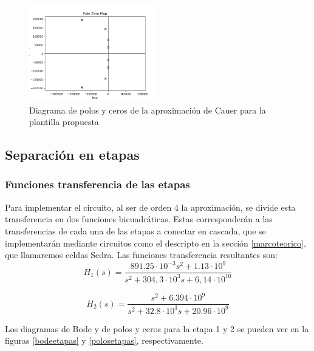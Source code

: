 \documentclass[spanish]{article}
\begin{document}
\begin{figure}[H]
\begin{centering}
\includegraphics[width=0.5\textwidth]{Resources/poloscauer.png}
\par\end{centering}
\caption{Diagrama de polos y ceros de la aproximación de Cauer para la plantilla propuesta}
\label{poloscauer}
\end{figure}

\subsection{Separación en etapas}
\subsubsection{Funciones transferencia de las etapas}
Para implementar el circuito, al ser de orden 4 la aproximación, se divide esta transferencia en dos funciones bicuadráticas. Estas corresponderán a las transferencias de cada una de las etapas a conectar en cascada, que se implementarán mediante circuitos como el descripto en la sección \ref{marcoteorico}, que llamaremos celdas Sedra.
Las funciones transferencia resultantes son:
\[
H_{1}(s)=\frac{891.25\cdot10^{-3}s^{2}+1.13\cdot10^{9}}{s^{2}+304,3\cdot10^{3}s+6,14\cdot10^{10}}
\]

\[
H_{2}(s)=\frac{s^{2}+6.394\cdot10^{9}}{s^{2}+32.8\cdot10^{3}s+20.96\cdot10^{9}}
\]

Los diagramas de Bode y de polos y ceros para la etapa 1 y 2 se pueden ver en la figuras \ref{bodeetapas} y \ref{polosetapas}, respectivamente.
\end{document}

